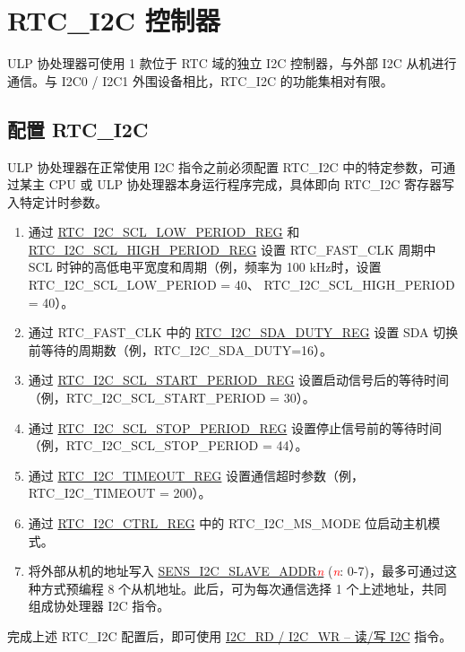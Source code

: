 \documentclass[main\_\_CN.tex]{subfiles}
\begin{document}
\section{RTC\_I2C 控制器} \label{subsection:RTC_I2C-Controller}

ULP 协处理器可使用 1 款位于 RTC 域的独立 I2C 控制器，与外部 I2C 从机进行通信。与 I2C0 / I2C1 外围设备相比，RTC\_I2C 的功能集相对有限。


\subsection{配置 RTC\_I2C}

ULP 协处理器在正常使用 I2C 指令之前必须配置 RTC\_I2C 中的特定参数，可通过某主 CPU 或 ULP 协处理器本身运行程序完成，具体即向 RTC\_I2C 寄存器写入特定计时参数。

\begin{enumerate}
    \item 通过 \hyperref[regdesc:RTCI2CSCLLOWPERIODREG]{RTC\_I2C\_SCL\_LOW\_PERIOD\_REG} 和 \hyperref[regdesc:RTCI2CSCLHIGHPERIODREG]{RTC\_I2C\_SCL\_HIGH\_PERIOD\_REG} 设置 RTC\_FAST\_CLK 周期中 SCL 时钟的高低电平宽度和周期（例，频率为 100 kHz时，设置 RTC\_I2C\_SCL\_LOW\_PERIOD = 40、 RTC\_I2C\_SCL\_HIGH\_PERIOD = 40）。
    \item 通过 RTC\_FAST\_CLK 中的 \hyperref[regdesc:RTCI2CSDADUTYREG]{RTC\_I2C\_SDA\_DUTY\_REG} 设置 SDA 切换前等待的周期数（例，RTC\_I2C\_SDA\_DUTY=16）。
    \item 通过 \hyperref[regdesc:RTCI2CSCLSTARTPERIODREG]{RTC\_I2C\_SCL\_START\_PERIOD\_REG} 设置启动信号后的等待时间（例，RTC\_I2C\_SCL\_START\_PERIOD = 30）。
    \item 通过 \hyperref[regdesc:RTCI2CSCLSTOPPERIODREG]{RTC\_I2C\_SCL\_STOP\_PERIOD\_REG} 设置停止信号前的等待时间（例，RTC\_I2C\_SCL\_STOP\_PERIOD = 44）。
    \item 通过 \hyperref[regdesc:RTCI2CTIMEOUTREG]{RTC\_I2C\_TIMEOUT\_REG} 设置通信超时参数（例，RTC\_I2C\_TIMEOUT = 200）。
    \item 通过 \hyperref[regdesc:RTCI2CCTRLREG]{RTC\_I2C\_CTRL\_REG} 中的 RTC\_I2C\_MS\_MODE 位启动主机模式。
    \item 将外部从机的地址写入 \hyperref[regdesc:SENSSARSLAVEADDR1REG]{SENS\_I2C\_SLAVE\_ADDR\textcolor{red}{\it{n}}} (\textcolor{red}{\it{n}}: 0-7)，最多可通过这种方式预编程 8 个从机地址。此后，可为每次通信选择 1 个上述地址，共同组成协处理器 I2C 指令。
\end{enumerate}

完成上述 RTC\_I2C 配置后，即可使用 \hyperref[subsection:I2C]{I2C\_RD / I2C\_WR – 读/写 I2C} 指令。
\end{document}

